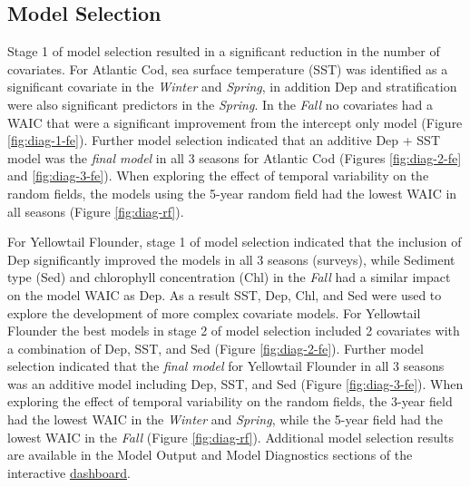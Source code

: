 \documentclass[
]{article}
\begin{document}
\hypertarget{model-selection}{%
\subsection{Model Selection}\label{model-selection}}

Stage 1 of model selection resulted in a significant reduction in the number of covariates. For Atlantic Cod, sea surface temperature (SST) was identified as a significant covariate in the \emph{Winter} and \emph{Spring}, in addition Dep and stratification were also significant predictors in the \emph{Spring}. In the \emph{Fall} no covariates had a WAIC that were a significant improvement from the intercept only model (Figure \ref{fig:diag-1-fe}). Further model selection indicated that an additive Dep + SST model was the \emph{final model} in all 3 seasons for Atlantic Cod (Figures \ref{fig:diag-2-fe} and \ref{fig:diag-3-fe}). When exploring the effect of temporal variability on the random fields, the models using the 5-year random field had the lowest WAIC in all seasons (Figure \ref{fig:diag-rf}).

For Yellowtail Flounder, stage 1 of model selection indicated that the inclusion of Dep significantly improved the models in all 3 seasons (surveys), while Sediment type (Sed) and chlorophyll concentration (Chl) in the \emph{Fall} had a similar impact on the model WAIC as Dep. As a result SST, Dep, Chl, and Sed were used to explore the development of more complex covariate models. For Yellowtail Flounder the best models in stage 2 of model selection included 2 covariates with a combination of Dep, SST, and Sed (Figure \ref{fig:diag-2-fe}). Further model selection indicated that the \emph{final model} for Yellowtail Flounder in all 3 seasons was an additive model including Dep, SST, and Sed (Figure \ref{fig:diag-3-fe}). When exploring the effect of temporal variability on the random fields, the 3-year field had the lowest WAIC in the \emph{Winter} and \emph{Spring}, while the 5-year field had the lowest WAIC in the \emph{Fall} (Figure \ref{fig:diag-rf}). Additional model selection results are available in the Model Output and Model Diagnostics sections of the interactive \href{https://github.com/Dave-Keith/Paper_2_SDMs/tree/master/Dashboard}{dashboard}.
\end{document}
